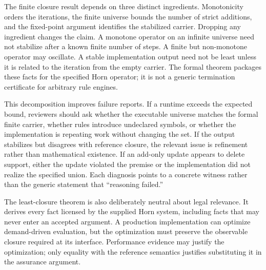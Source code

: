 The finite closure result depends on three distinct ingredients. Monotonicity orders the iterations, the finite universe bounds the number of strict additions, and the fixed-point argument identifies the stabilized carrier. Dropping any ingredient changes the claim. A monotone operator on an infinite universe need not stabilize after a known finite number of steps. A finite but non-monotone operator may oscillate. A stable implementation output need not be least unless it is related to the iteration from the empty carrier. The formal theorem packages these facts for the specified Horn operator; it is not a generic termination certificate for arbitrary rule engines.

This decomposition improves failure reports. If a runtime exceeds the expected bound, reviewers should ask whether the executable universe matches the formal finite carrier, whether rules introduce undeclared symbols, or whether the implementation is repeating work without changing the set. If the output stabilizes but disagrees with reference closure, the relevant issue is refinement rather than mathematical existence. If an add-only update appears to delete support, either the update violated the premise or the implementation did not realize the specified union. Each diagnosis points to a concrete witness rather than the generic statement that ``reasoning failed.''

The least-closure theorem is also deliberately neutral about legal relevance. It derives every fact licensed by the supplied Horn system, including facts that may never enter an accepted argument. A production implementation can optimize demand-driven evaluation, but the optimization must preserve the observable closure required at its interface. Performance evidence may justify the optimization; only equality with the reference semantics justifies substituting it in the assurance argument.

